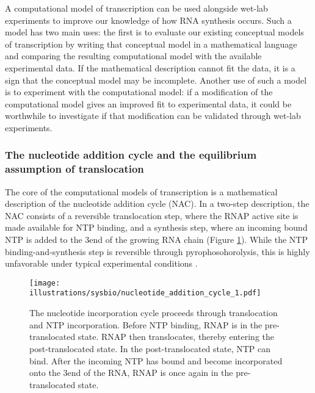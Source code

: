%
%
A computational model of transcription can be used alongside wet-lab
experiments to improve our knowledge of how RNA synthesis occurs. Such a model
has two main uses: the first is to evaluate our existing conceptual models of
transcription by writing that conceptual model in a mathematical language and
comparing the resulting computational model with the available experimental
data. If the mathematical description cannot fit the data, it is a sign that
the conceptual model may be incomplete. Another use of such a model is to
experiment with the computational model: if a modification of the
computational model gives an improved fit to experimental data, it could be
worthwhile to investigate if that modification can be validated through
wet-lab experiments.

\subsubsection{The nucleotide addition cycle and the equilibrium assumption of
translocation}
The core of the computational models of transcription is a mathematical
description of the nucleotide addition cycle (NAC). In a two-step description,
the NAC consists of a reversible translocation step, where the RNAP active site
is made available for NTP binding, and a synthesis step, where an incoming
bound NTP is added to the 3\ppp end of the growing RNA chain (Figure
\ref{fig:nac_1}). While the NTP binding-and-synthesis step is reversible
through pyrophosohorolysis, this is highly unfavorable under typical
experimental conditions \cite{buc_chapter_2009}.
\begin{figure}[htb]
	\begin{center}
		\texttt{[image: illustrations/sysbio/nucleotide\_addition\_cycle\_1.pdf]}
	\end{center}
	\caption{The nucleotide incorporation cycle proceeds through
	translocation and NTP incorporation. Before NTP binding, RNAP is in the
	pre-translocated state. RNAP then translocates, thereby entering the
	post-translocated state. In the post-translocated state, NTP can bind.
    After the incoming NTP has bound and become incorporated onto the
    3\protect\ppp end of the RNA, RNAP is once again in the pre-translocated
    state.}
	\label{fig:nac_1}
\end{figure}

